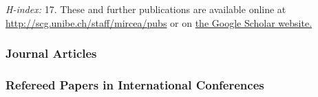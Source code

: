 

\emph{H-index:} 17.
These and further publications are available online at \url{http://scg.unibe.ch/staff/mircea/pubs} or on \href{http://scholar.google.ch/citations?user=7zx6Cg0AAAAJ}{the Google Scholar website.}

\subsubsection*{Journal Articles}
	

\subsubsection*{Refereed Papers in International Conferences}
	
